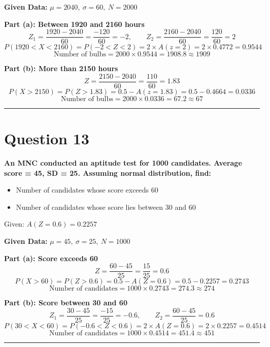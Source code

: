 \documentclass[12pt,a4paper]{article}
\begin{document}
\textbf{Given Data:} $\mu = 2040,\ \sigma = 60,\ N = 2000$

\textbf{Part (a): Between 1920 and 2160 hours}
\[
Z_1 = \frac{1920-2040}{60} = \frac{-120}{60} = -2, \qquad Z_2 = \frac{2160-2040}{60} = \frac{120}{60} = 2
\]
\[
P(1920 < X < 2160) = P(-2 < Z < 2) = 2 \times A(z=2) = 2 \times 0.4772 = 0.9544
\]
\[
\text{Number of bulbs} = 2000 \times 0.9544 = 1908.8 \approx \boxed{1909}
\]

\textbf{Part (b): More than 2150 hours}
\[
Z = \frac{2150-2040}{60} = \frac{110}{60} = 1.83
\]
\[
P(X > 2150) = P(Z > 1.83) = 0.5 - A(z=1.83) = 0.5 - 0.4664 = 0.0336
\]
\[
\text{Number of bulbs} = 2000 \times 0.0336 = 67.2 \approx \boxed{67}
\]

\vspace{1em}\hrule\vspace{1em}

\section{Question 13}
\textbf{An MNC conducted an aptitude test for 1000 candidates. Average score = 45, SD = 25. Assuming normal distribution, find:}
\begin{itemize}[noitemsep]
\item[(a)] Number of candidates whose score exceeds 60
\item[(b)] Number of candidates whose score lies between 30 and 60
\end{itemize}
Given: $A(Z=0.6) = 0.2257$

\textbf{Given Data:} $\mu = 45,\ \sigma = 25,\ N = 1000$

\textbf{Part (a): Score exceeds 60}
\[
Z = \frac{60-45}{25} = \frac{15}{25} = 0.6
\]
\[
P(X > 60) = P(Z > 0.6) = 0.5 - A(Z=0.6) = 0.5 - 0.2257 = 0.2743
\]
\[
\text{Number of candidates} = 1000 \times 0.2743 = 274.3 \approx \boxed{274}
\]

\textbf{Part (b): Score between 30 and 60}
\[
Z_1 = \frac{30-45}{25} = \frac{-15}{25} = -0.6, \qquad Z_2 = \frac{60-45}{25} = 0.6
\]
\[
P(30 < X < 60) = P(-0.6 < Z < 0.6) = 2 \times A(Z=0.6) = 2 \times 0.2257 = 0.4514
\]
\[
\text{Number of candidates} = 1000 \times 0.4514 = 451.4 \approx \boxed{451}
\]

\vspace{1em}\hrule\vspace{1em}
\end{document}
